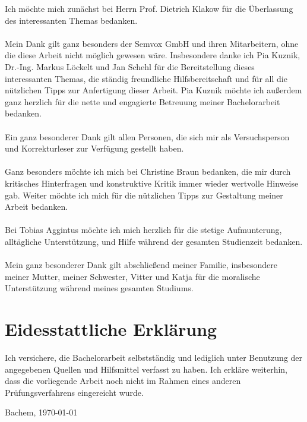 \documentclass[12pt,a4paper]{scrartcl}
\begin{document}
Ich möchte mich zunächst bei Herrn Prof. Dietrich Klakow für die Überlassung des interessanten Themas bedanken.\\
\\
Mein Dank gilt ganz besonders der Semvox GmbH und ihren Mitarbeitern, ohne die diese Arbeit nicht möglich gewesen wäre. Insbesondere danke ich Pia Kuznik, Dr.-Ing. Markus Löckelt und Jan Schehl für die Bereitstellung dieses interessanten Themas, die ständig freundliche Hilfsbereitschaft und für all die nützlichen Tipps zur Anfertigung dieser Arbeit. 
Pia Kuznik möchte ich außerdem ganz herzlich für die nette und engagierte Betreuung meiner Bachelorarbeit bedanken.\\
\\
Ein ganz besonderer Dank gilt allen Personen, die sich mir als Versuchsperson und Korrekturleser zur Verfügung
gestellt haben.\\
\\
Ganz besonders möchte ich mich bei Christine Braun bedanken, die mir durch kritisches Hinterfragen und konstruktive Kritik immer wieder wertvolle Hinweise gab. Weiter möchte ich mich für die nützlichen Tipps zur Gestaltung meiner Arbeit bedanken.\\
\\
Bei Tobias Aggintus möchte ich mich herzlich für die stetige Aufmunterung, alltägliche Unterstützung, 
und Hilfe während der gesamten Studienzeit bedanken. \\
\\
Mein ganz besonderer Dank gilt abschließend meiner Familie, insbesondere meiner Mutter, meiner Schwester, Vitter und Katja für die moralische Unterstützung während meines gesamten Studiums. \\
\cfoot{}
\cleardoublepage

\section*{Eidesstattliche Erklärung}

\cfoot{}
Ich versichere, die Bachelorarbeit selbstständig und lediglich unter Benutzung der angegebenen Quellen und Hilfsmittel verfasst zu haben.
\newline
\newline
Ich erkläre weiterhin, dass die vorliegende Arbeit noch nicht im Rahmen eines anderen Prüfungsverfahrens eingereicht wurde.
\newline
\newline

Bachem, \today
\end{document}

